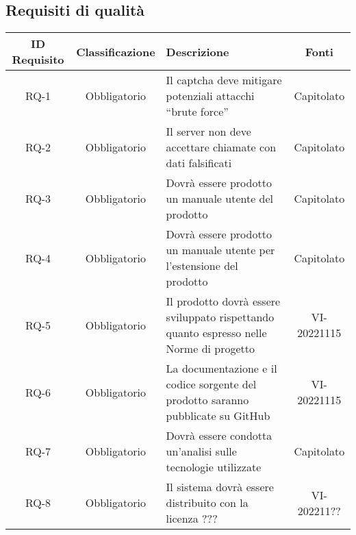 \vspace{60pt}

\subsection{Requisiti di qualità}
\renewcommand\tabularxcolumn[1]{>{\Centering}m{#1}}
\begin{tabularx}{\textwidth}{| c | c | X | c |} 
 \hline
 \textbf{ID Requisito} & \textbf{Classificazione} & \textbf{Descrizione} & \textbf{Fonti} \\
 \hline
 RQ-1 & Obbligatorio &  Il captcha deve mitigare potenziali attacchi “brute force” & Capitolato\\
 \hline
  RQ-2 & Obbligatorio & Il server non deve accettare chiamate con dati falsificati & Capitolato\\
 \hline
 RQ-3 & Obbligatorio &  Dovrà essere prodotto un manuale utente del prodotto & Capitolato\\
 \hline
 RQ-4 & Obbligatorio &  Dovrà essere prodotto un manuale utente per l'estensione del prodotto &  Capitolato\\
 \hline
 RQ-5 & Obbligatorio & Il prodotto dovrà essere sviluppato rispettando quanto espresso nelle Norme di progetto & VI-20221115\\
 \hline
 RQ-6 & Obbligatorio &  La documentazione e il codice sorgente del prodotto saranno pubblicate su GitHub & VI-20221115\\
 \hline
 RQ-7 & Obbligatorio & Dovrà essere condotta un'analisi sulle tecnologie utilizzate & Capitolato\\
 \hline
 RQ-8 & Obbligatorio &  Il sistema dovrà essere distribuito con la licenza ??? & VI-202211??\\
 \hline
\end{tabularx}









